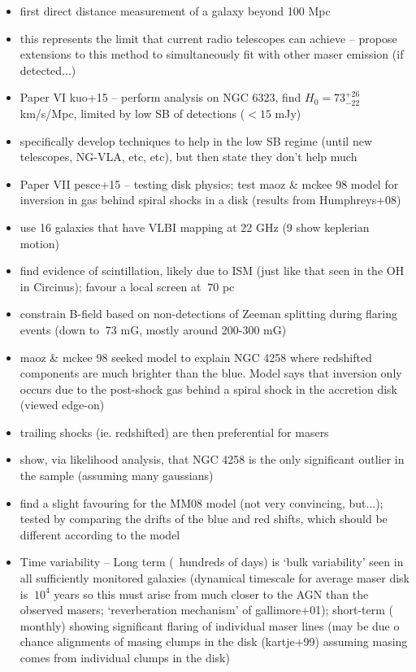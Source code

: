 \begin{itemize}
\item first direct distance measurement of a galaxy beyond 100 Mpc
\item this represents the limit that current radio telescopes can achieve -- propose extensions to this method to simultaneously fit with other maser emission (if detected...)
\item Paper VI kuo+15 -- perform analysis on NGC 6323, find $H_0=73^{+26}_{-22}$ km/s/Mpc, limited by low SB of detections ($\lt 15$ mJy)
\item specifically develop techniques to help in the low SB regime (until new telescopes, NG-VLA, etc, etc), but then state they don't help much
\item Paper VII pesce+15 -- testing disk physics; test maoz & mckee 98 model for inversion in gas behind spiral shocks in a disk (results from Humphreys+08)
\item use 16 galaxies that have VLBI mapping at 22 GHz (9 show keplerian motion) 
\item find evidence of scintillation, likely due to ISM (just like that seen in the OH in Circinus); favour a local screen at $~70$ pc
\item constrain B-field based on non-detections of Zeeman splitting during flaring events (down to $~73$ mG, mostly around 200-300 mG)
\item maoz & mckee 98 seeked model to explain NGC 4258 where redshifted components are much brighter than the blue. Model says that inversion only occurs due to the post-shock gas behind a spiral shock in the accretion disk (viewed edge-on)
\item trailing shocks (ie. redshifted) are then preferential for masers
\item show, via likelihood analysis, that NGC 4258 is the only significant outlier in the sample (assuming many gaussians)
\item find a slight favouring for the MM08 model (not very convincing, but...); tested by comparing the drifts of the blue and red shifts, which should be different according to the model
\item Time variability -- Long term (~hundreds of days) is `bulk variability' seen in all sufficiently monitored galaxies (dynamical timescale for average maser disk is $~10^4$ years so this must arise from much closer to the AGN than the observed masers; `reverberation mechanism' of gallimore+01); short-term ($~$monthly) showing significant flaring of individual maser lines (may be due o chance alignments of masing clumps in the disk (kartje+99) assuming masing comes from individual clumps in the disk)

\end{itemize}
